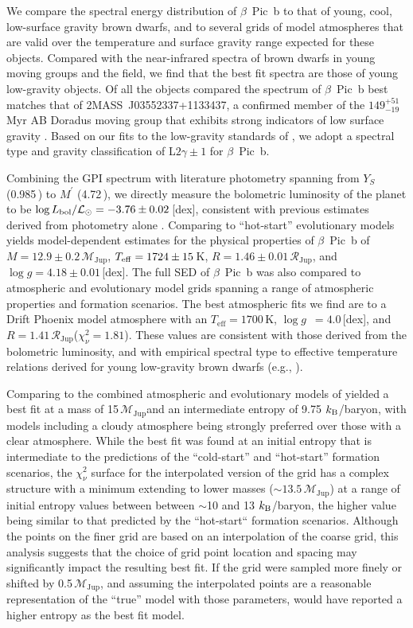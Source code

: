 \documentclass[twocolumn]{aastex6}
\newcommand{\teff}{$T_\mathrm{eff}$}
\newcommand{\logg}{$\log g$~}
\newcommand{\rjup}{$\mathcal{R}_\mathrm{Jup}$}
\newcommand{\mjup}{$\mathcal{M}_\mathrm{Jup}$}
\begin{document}
We compare the spectral energy distribution of $\beta$~Pic~b to that of young, cool, low-surface gravity brown dwarfs, and to several grids of model atmospheres that are valid over the temperature and surface gravity range expected for these objects. Compared with the near-infrared spectra of brown dwarfs in young moving groups and the field, we find that the best fit spectra are those of young low-gravity objects. Of all the objects compared the spectrum of $\beta$~Pic~b best matches that of 2MASS~J03552337+1133437, a confirmed member of the $149^{+51}_{-19}$\,Myr AB Doradus moving group that exhibits strong indicators of low surface gravity \citep{Faherty:2013bc,Liu:2013ej,Gagne:2015dc}. Based on our fits to the low-gravity standards of \citet{Allers2013}, we adopt a spectral type and gravity classification of L$2\gamma\pm1$ for $\beta$~Pic~b.

Combining the GPI spectrum with literature photometry spanning from $Y_{S}$ (0.985\,\micron) to $M^{\prime}$ (4.72\,\micron), we directly measure the bolometric luminosity of the planet to be $\log L_{\rm bol}/{\mathcal L}_{\odot}=-3.76\pm0.02$\,[dex], consistent with previous estimates derived from photometry alone \citep{Morzinski2015}. Comparing to ``hot-start'' evolutionary models \citet{2003A&A...402..701B} yields model-dependent estimates for the physical properties of $\beta$~Pic~b of $M=12.9\pm0.2$\,\mjup, $T_{\rm eff} = 1724\pm15$\,K, $R = 1.46\pm0.01$\,\rjup, and $\log g = 4.18\pm0.01$\,[dex]. The full SED of $\beta$~Pic~b was also compared to atmospheric and evolutionary model grids spanning a range of atmospheric properties and formation scenarios. The best atmospheric fits we find are to a {\sc Drift Phoenix} model atmosphere with an \teff$ = 1700$\,K, \logg$=4.0$\,[dex], and $R=1.41$\,\rjup ($\chi^{2}_{\nu} = 1.81$). These values are consistent with those derived from the bolometric luminosity, and with empirical spectral type to effective temperature relations derived for young low-gravity brown dwarfs (e.g., \citealp{Faherty:2016fx}).

Comparing to the combined atmospheric and evolutionary models of \citet{SpiegelBurrows2012} yielded a best fit at a mass of 15\,\mjup and an intermediate entropy of 9.75 $k_{\rm B}$/baryon, with models including a cloudy atmosphere being strongly preferred over those with a clear atmosphere. While the best fit was found at an initial entropy that is intermediate to the predictions of the ``cold-start'' and ``hot-start'' formation scenarios, the $\chi^2_{\nu}$ surface for the interpolated version of the grid has a complex structure with a minimum extending to lower masses ($\sim13.5$\,\mjup) at a range of initial entropy values between between $\sim$10 and 13 $k_{\rm B}$/baryon, the higher value being similar to that predicted by the ``hot-start`` formation scenarios. Although the points on the finer grid are based on an interpolation of the coarse grid, this analysis suggests that the choice of grid point location and spacing may significantly impact the resulting best fit. If the grid were sampled more finely or shifted by 0.5\,\mjup, and assuming the interpolated points are a reasonable representation of the ``true'' model with those parameters, \citet{Morzinski2015} would have reported a higher entropy as the best fit model.
\end{document}
